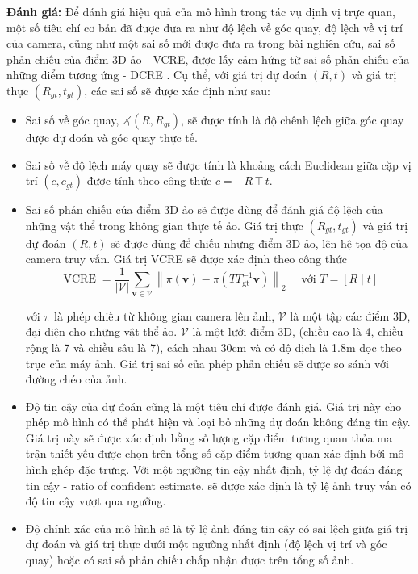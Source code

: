 \textbf{Đánh giá:} Để đánh giá hiệu quả của mô hình trong tác vụ định vị trực quan, một số tiêu chí cơ bản đã được đưa ra như độ lệch về góc quay, độ lệch về vị trí của camera, cũng như một sai số mới được đưa ra trong bài nghiên cứu, sai số phản chiếu của điểm 3D ảo - VCRE, được lấy cảm hứng từ sai số phản chiếu của những điểm tương ứng - DCRE \cite{wald2020beyond}. Cụ thể, với giá trị dự đoán $(R,t)$ và giá trị thực $(R_{gt},t_{gt})$, các sai số sẽ được xác định như sau:
\begin{itemize}
    \item Sai số về góc quay, $\measuredangle(R,R_{gt})$, sẽ được tính là độ chênh lệch giữa góc quay được dự đoán và góc quay thực tế.
    \item Sai số về độ lệch máy quay sẽ được tính là khoảng cách Euclidean giữa cặp vị trí $(c,c_{gt})$ được tính theo công thức $c=-R \intercal t$.
    \item Sai số phản chiếu của điểm 3D ảo sẽ được dùng để đánh giá độ lệch của những vật thể trong không gian thực tế ảo. Giá trị thực $(R_{gt},t_{gt})$ và giá trị dự đoán $(R,t)$ sẽ được dùng để chiếu những điểm 3D ảo, lên hệ tọa độ của camera truy vấn. Giá trị VCRE sẽ được xác định theo công thức
    $$
    \operatorname{VCRE}=\frac{1}{|\mathcal{V}|} \sum_{\mathbf{v} \in \mathcal{V}}\left\|\pi(\mathbf{v})-\pi\left(T T_{\mathrm{gt}}^{-1} \mathbf{v}\right)\right\|_2 \quad \text { với } T=[R \mid t]
    $$

    với $\pi$ là phép chiếu từ không gian camera lên ảnh, $\mathcal{V}$ là một tập các điểm 3D, đại diện cho những vật thể ảo. $\mathcal{V}$ là một lưới điểm 3D, (chiều cao là 4, chiều rộng là 7 và chiều sâu là 7), cách nhau 30cm và có độ dịch là 1.8m dọc theo trục của máy ảnh. Giá trị sai số của phép phản chiếu sẽ được so sánh với đường chéo của ảnh.
    \item Độ tin cậy của dự đoán cũng là một tiêu chí được đánh giá. Giá trị này cho phép mô hình có thể phát hiện và loại bỏ những dự đoán không đáng tin cậy. Giá trị này sẽ được xác định bằng số lượng cặp điểm tương quan thỏa ma trận thiết yếu được chọn trên tổng số cặp điểm tương quan xác định bởi mô hình ghép đặc trưng. Với một ngưỡng tin cậy nhất định, tỷ lệ dự đoán đáng tin cậy - ratio of confident estimate, sẽ được xác định là tỷ lệ ảnh truy vấn có độ tin cậy vượt qua ngưỡng.
    \item Độ chính xác của mô hình sẽ là tỷ lệ ảnh đáng tin cậy có sai lệch giữa giá trị dự đoán và giá trị thực dưới một ngưỡng nhất định (độ lệch vị trí và góc quay) hoặc có sai số phản chiếu chấp nhận được trên tổng số ảnh.
\end{itemize}


